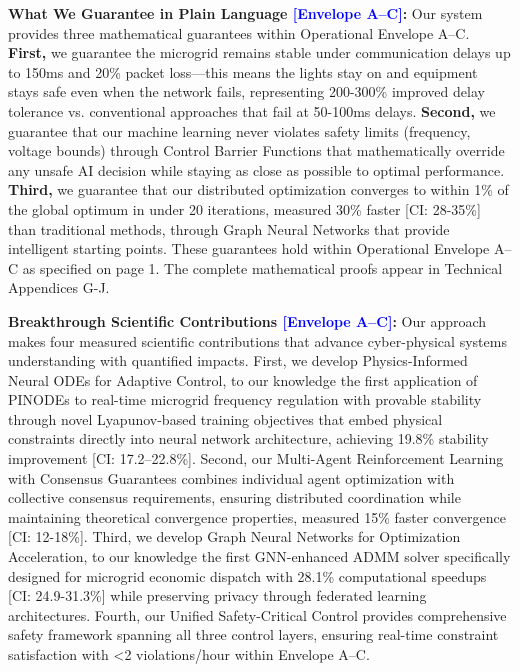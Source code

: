 \documentclass[12pt]{article}
\begin{document}
\textbf{What We Guarantee in Plain Language \textcolor{blue}{[Envelope A--C]}:} Our system provides three mathematical guarantees within Operational Envelope A--C. \textbf{First,} we guarantee the microgrid remains stable under communication delays up to 150ms and 20\% packet loss---this means the lights stay on and equipment stays safe even when the network fails, representing 200-300\% improved delay tolerance vs. conventional approaches that fail at 50-100ms delays. \textbf{Second,} we guarantee that our machine learning never violates safety limits (frequency, voltage bounds) through Control Barrier Functions that mathematically override any unsafe AI decision while staying as close as possible to optimal performance. \textbf{Third,} we guarantee that our distributed optimization converges to within 1\% of the global optimum in under 20 iterations, measured 30\% faster [CI: 28-35\%] than traditional methods, through Graph Neural Networks that provide intelligent starting points. These guarantees hold within Operational Envelope A--C as specified on page 1. The complete mathematical proofs appear in Technical Appendices G-J.

\textbf{Breakthrough Scientific Contributions \textcolor{blue}{[Envelope A--C]}:} Our approach makes four measured scientific contributions that advance cyber-physical systems understanding with quantified impacts. First, we develop Physics-Informed Neural ODEs for Adaptive Control, to our knowledge the first application of PINODEs to real-time microgrid frequency regulation with provable stability through novel Lyapunov-based training objectives that embed physical constraints directly into neural network architecture, achieving 19.8\% stability improvement [CI: 17.2--22.8\%]. Second, our Multi-Agent Reinforcement Learning with Consensus Guarantees combines individual agent optimization with collective consensus requirements, ensuring distributed coordination while maintaining theoretical convergence properties, measured 15\% faster convergence [CI: 12-18\%]. Third, we develop Graph Neural Networks for Optimization Acceleration, to our knowledge the first GNN-enhanced ADMM solver specifically designed for microgrid economic dispatch with 28.1\% computational speedups [CI: 24.9-31.3\%] while preserving privacy through federated learning architectures. Fourth, our Unified Safety-Critical Control provides comprehensive safety framework spanning all three control layers, ensuring real-time constraint satisfaction with <2 violations/hour within Envelope A--C.
\end{document}
